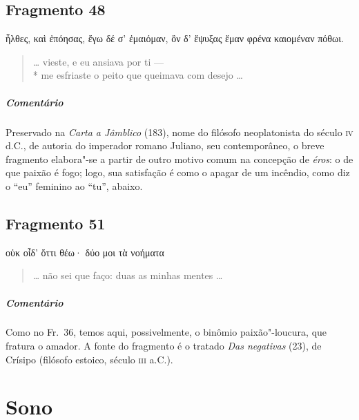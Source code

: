 {\section{Fragmento 48}

\begin{gkverse}
ἦλθες, \dagger{}καὶ\dagger{} ἐπόησας, ἔγω δέ σ’ ἐμαιόμαν,
ὂν δ’ ἔψυξας ἔμαν φρένα καιομέναν πόθωι.
\end{gkverse}

\begin{verse}
\ldots{} vieste, e eu ansiava por ti --- \\*
me esfriaste o peito que queimava com desejo \ldots{}
\end{verse}

{\paragraph{Comentário} Preservado na \textit{Carta a Jâmblico} (183), nome do filósofo neoplatonista do
século \textsc{iv} d.C., de autoria do imperador romano Juliano, seu contemporâneo, o
breve fragmento elabora"-se a partir de outro motivo comum na concepção de
\textit{éros}: o de que paixão é fogo; logo, sua satisfação é como o apagar de
um incêndio, como diz o “eu” feminino ao “tu”, abaixo.}

\section{Fragmento 51}

\begin{gkverse}
οὐκ οἶδ’ ὄττι θέω· δύο μοι τὰ νοήματα
\end{gkverse}

\begin{verse}
\ldots{} não sei que faço: duas as minhas mentes \ldots{}
\end{verse}

{\paragraph{Comentário} Como no Fr.~36, temos aqui, possivelmente, o binômio paixão"-loucura, que fratura o amador. A
fonte do fragmento é o tratado \textit{Das negativas} (23), de Crísipo (filósofo
estoico, século \textsc{iii} a.C.).}   


\chapter{Sono}

}
